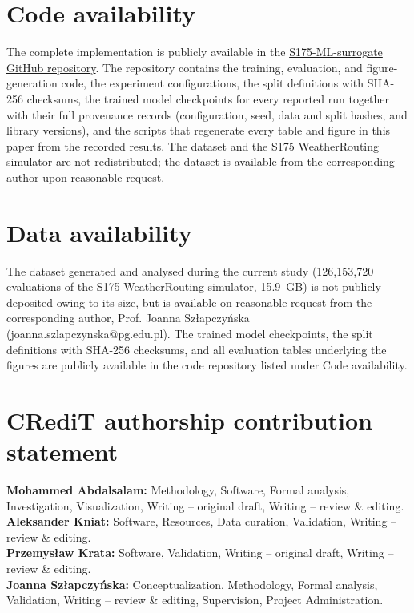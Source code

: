 \documentclass[final,5p,times,twocolumn,numbers]{elsarticle}
\begin{document}
\section*{Code availability}
The complete implementation is publicly available in the \href{https://github.com/MOHAMMED-ABDALSALAM-PG/S175-ML-surrogate}{S175-ML-surrogate GitHub repository}. The repository contains the training, evaluation, and figure-generation code, the experiment configurations, the split definitions with SHA-256 checksums, the trained model checkpoints for every reported run together with their full provenance records (configuration, seed, data and split hashes, and library versions), and the scripts that regenerate every table and figure in this paper from the recorded results. The dataset and the S175 WeatherRouting simulator are not redistributed; the dataset is available from the corresponding author upon reasonable request.

\section*{Data availability}
The dataset generated and analysed during the current study (126{,}153{,}720 evaluations of the S175 WeatherRouting simulator, 15.9~GB) is not publicly deposited owing to its size, but is available on reasonable request from the corresponding author, Prof. Joanna Sz{\l}apczy{\'n}ska (joanna.szlapczynska@pg.edu.pl). The trained model checkpoints, the split definitions with SHA-256 checksums, and all evaluation tables underlying the figures are publicly available in the code repository listed under Code availability.
\section*{CRediT authorship contribution statement}

\textbf{Mohammed Abdalsalam:} Methodology, Software, Formal analysis, Investigation, Visualization,
Writing -- original draft, Writing -- review \& editing.\\
\textbf{Aleksander Kniat:} Software, Resources, Data curation, Validation,
Writing -- review \& editing.\\
\textbf{Przemys{\l}aw Krata:} Software, Validation, Writing -- original draft,
Writing -- review \& editing.\\
\textbf{Joanna Sz{\l}apczy{\'n}ska:}  Conceptualization, Methodology, Formal analysis, Validation, Writing -- review \& editing, Supervision, Project Administration.
\end{document}
